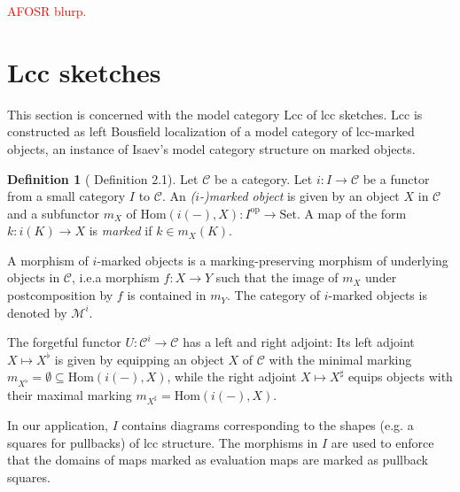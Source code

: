 \documentclass[a4paper]{article}
\newcommand{\todo}[1]{\textcolor{red}{#1}}
\theoremstyle{remark}
\theoremstyle{definition}
\newtheorem{definition}[theorem]{Definition}
\begin{document}
\todo{AFOSR blurp.}

\section{Lcc sketches}
\label{sec:lcc-sketches}

This section is concerned with the model category $\mathrm{Lcc}$ of lcc sketches.
$\mathrm{Lcc}$ is constructed as left Bousfield localization of a model category of lcc-marked objects, an instance of Isaev's model category structure on marked objects.

\begin{definition}[\cite{marked-objects} Definition 2.1]
  Let $\mathcal{C}$ be a category.
  Let $i : I \rightarrow \mathcal{C}$ be a functor from a small category $I$ to $\mathcal{C}$.
  An \emph{($i$-)marked object} is given by an object $X$ in $\mathcal{C}$ and a subfunctor $m_X$ of $\mathrm{Hom}(i(-), X) : I^\mathrm{op} \rightarrow \mathrm{Set}$.
  A map of the form $k : i(K) \rightarrow X$ is \emph{marked} if $k \in m_X(K)$.

  A morphism of $i$-marked objects is a marking-preserving morphism of underlying objects in $\mathcal{C}$, i.e.\@ a morphism $f : X \rightarrow Y$ such that the image of $m_X$ under postcomposition by $f$ is contained in $m_Y$.
  The category of $i$-marked objects is denoted by $\mathcal{M}^i$.
\end{definition}

The forgetful functor $U : \mathcal{C}^i \rightarrow \mathcal{C}$ has a left and right adjoint:
Its left adjoint $X \mapsto X^\flat$ is given by equipping an object $X$ of $\mathcal{C}$ with the minimal marking $m_{X^\flat} = \emptyset \subseteq \mathrm{Hom}(i(-), X)$, while the right adjoint $X \mapsto X^\sharp$ equips objects with their maximal marking $m_{X^\sharp} = \mathrm{Hom}(i(-), X)$.

In our application, $I$ contains diagrams corresponding to the shapes (e.g. a squares for pullbacks) of lcc structure.
The morphisms in $I$ are used to enforce that the domains of maps marked as evaluation maps are marked as pullback squares.
\end{document}
